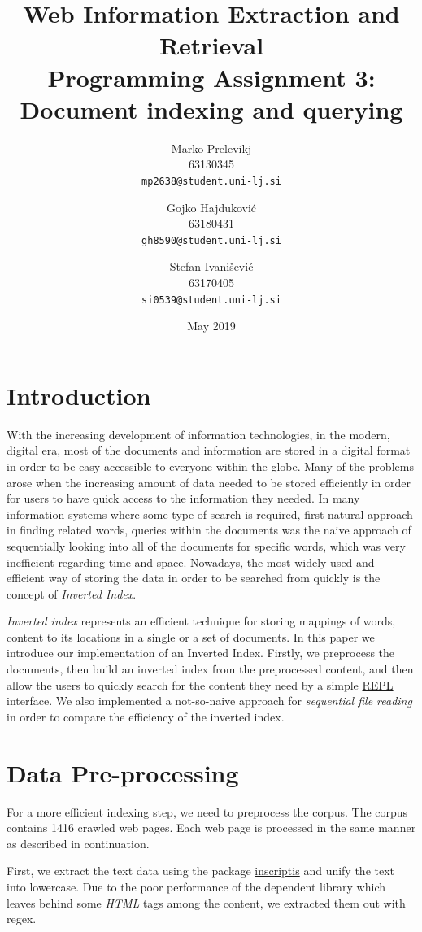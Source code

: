 \documentclass{article}
\title{
Web Information Extraction and Retrieval\\
Programming Assignment 3: \\
Document indexing and querying
}
\author{
Marko Prelevikj\\
63130345\\
\texttt{mp2638@student.uni-lj.si}
\and
Gojko Hajduković\\
63180431\\
\texttt{gh8590@student.uni-lj.si}
\and
Stefan Ivanišević\\
63170405\\
\texttt{si0539@student.uni-lj.si}
}
\date{May 2019}
\begin{document}
\maketitle
\section{Introduction}
With the increasing development of information technologies, in the modern, digital era, most of the documents and information are stored in a digital format in order to be easy accessible to everyone within the globe. Many of the problems arose when the increasing amount of data needed to be stored efficiently in order for users to have quick access to the information they needed. In many information systems where some type of search is required, first natural approach in finding related words, queries within the documents was the naive approach of sequentially looking into all of the documents for specific words, which was very inefficient regarding time and space. Nowadays, the most widely used and efficient way of storing the data in order to be searched from quickly is the concept of \textit{Inverted Index}.

\textit{Inverted index} represents an efficient technique for storing mappings of words, content to its locations in a single or a set of documents. In this paper we introduce our implementation of an Inverted Index. Firstly, we preprocess the documents, then build an inverted index from the preprocessed content, and then allow the users to quickly search for the content they need by a simple \href{https://en.wikipedia.org/wiki/Read%E2%80%93eval%E2%80%93print_loop}{ REPL} interface. We also implemented a not-so-naive approach for \textit{sequential file reading} in order to compare the efficiency of the inverted index.

\section{Data Pre-processing} \label{sec:Preprocess}
For a more efficient indexing step, we need to preprocess the corpus. The corpus contains 1416 crawled web pages. Each web page is processed in the same manner as described in continuation.

First, we extract the text data using the package \href{https://pypi.org/project/inscriptis/}{inscriptis} and unify the text into lowercase. Due to the poor performance of the dependent library which leaves behind some \textit{HTML} tags among the content, we extracted them out with regex.
\end{document}
